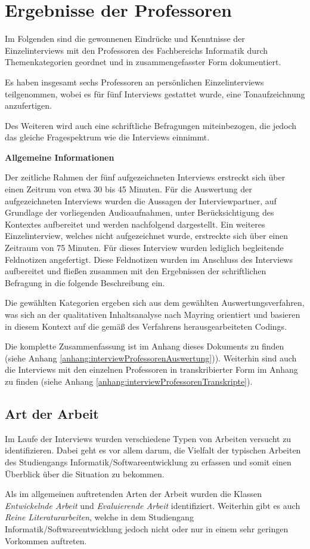 \documentclass[bibliography=totoc,listof=totoc,BCOR=5mm,DIV=12,oneside]{scrbook}
\begin{document}
\section{Ergebnisse der Professoren}
\par Im Folgenden sind die gewonnenen Eindrücke und Kenntnisse der Einzelinterviews mit den Professoren des Fachbereichs Informatik durch Themenkategorien geordnet und in zusammengefasster Form dokumentiert.
\par Es haben insgesamt sechs Professoren an persönlichen Einzelinterviews teilgenommen, wobei es für fünf Interviews gestattet wurde, eine Tonaufzeichnung anzufertigen.
\par\medskip Des Weiteren wird auch eine schriftliche Befragungen miteinbezogen, die jedoch das gleiche Fragespektrum wie die Interviews einnimmt.
\par\bigskip \textbf{Allgemeine Informationen}
\par Der zeitliche Rahmen der fünf aufgezeichneten Interviews erstreckt sich über einen Zeitrum von etwa 30 bis 45 Minuten. Für die Auswertung der aufgezeichneten Interviews wurden die Aussagen der Interviewpartner, auf Grundlage der vorliegenden Audioaufnahmen, unter Berücksichtigung des Kontextes aufbereitet und werden nachfolgend dargestellt. Ein weiteres Einzelinterview, welches nicht aufgezeichnet wurde, erstreckte sich über einen Zeitraum von 75 Minuten. Für dieses Interview wurden lediglich begleitende Feldnotizen angefertigt. Diese Feldnotizen wurden im Anschluss des Interviews aufbereitet und fließen zusammen mit den Ergebnissen der schriftlichen Befragung in die folgende Beschreibung ein.
\par\medskip Die gewählten Kategorien ergeben sich aus dem gewählten Auswertungsverfahren, was sich an der qualitativen Inhaltsanalyse nach Mayring\citep{Mayring2015} orientiert und basieren in diesem Kontext auf die gemäß des Verfahrens herausgearbeiteten Codings.

\par \bigskip Die komplette Zusammenfassung ist im Anhang dieses Dokuments zu finden (siehe Anhang \ref{anhang:interviewProfessorenAuswertung})). Weiterhin sind auch die Interviews mit den einzelnen Professoren in transkribierter Form im Anhang zu finden (siehe Anhang \ref{anhang:interviewProfessorenTranskripte}).

\newpage
\subsection{Art der Arbeit}
\par Im Laufe der Interviews wurden verschiedene Typen von Arbeiten versucht zu identifizieren. Dabei geht es vor allem darum, die Vielfalt der typischen Arbeiten des Studiengangs Informatik/Softwareentwicklung zu erfassen und somit einen Überblick über die Situation zu bekommen.
\par \medskip Als im allgemeinen auftretenden Arten der Arbeit wurden die Klassen \textit{Entwickelnde Arbeit}  und \textit{Evaluierende Arbeit} identifiziert. Weiterhin gibt es auch \textit{Reine Literaturarbeiten}, welche in dem Studiengang Informatik/Softwareentwicklung jedoch nicht oder nur in einem sehr geringen Vorkommen auftreten.
\end{document}
